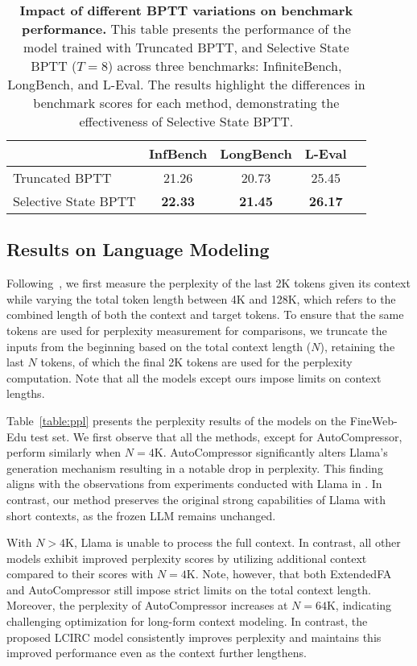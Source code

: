 \begin{table}[t]
\small
\centering
\begin{tabular}{lcccc}
\toprule
 & InfBench & LongBench & L-Eval \\ \midrule
Truncated BPTT & 21.26 & 20.73 & 25.45\\
Selective State BPTT & \textbf{22.33} & \textbf{21.45} & \textbf{26.17}\\ \bottomrule
\end{tabular}
\caption{\textbf{Impact of different BPTT variations on benchmark performance.} This table presents the performance of the model trained with Truncated BPTT, and Selective State BPTT ($T=8$) across three benchmarks: InfiniteBench, LongBench, and L-Eval. The results highlight the differences in benchmark scores for each method, demonstrating the effectiveness of Selective State BPTT.}
\label{table:cos}
\end{table}
\vspace{-0.2cm}


\subsection{Results on Language Modeling}
Following~\citet{autocompressor}, we first measure the perplexity of the last 2K tokens given its context while varying the total token length between 4K and 128K, which refers to the combined length of both the context and target tokens.
To ensure that the same tokens are used for perplexity measurement for comparisons, we truncate the inputs from the beginning based on the total context length ($N$), retaining the last $N$ tokens, of which the final 2K tokens are used for the perplexity computation.
Note that all the models except ours impose limits on context lengths. 

Table~\ref{table:ppl} presents the perplexity results of the models on the FineWeb-Edu test set.
We first observe that all the methods, except for AutoCompressor, perform similarly when $N=4$K.
AutoCompressor significantly alters Llama's generation mechanism resulting in a notable drop in perplexity.
This finding aligns with the observations from experiments conducted with Llama in \citet{autocompressor}.
In contrast, our method preserves the original strong capabilities of Llama with short contexts, as the frozen LLM remains unchanged.

With $N>4$K, Llama is unable to process the full context.
In contrast, all other models exhibit improved perplexity scores by utilizing additional context compared to their scores with $N=4$K. 
Note, however, that both ExtendedFA and AutoCompressor still impose strict limits on the total context length. 
Moreover, the perplexity of AutoCompressor increases at $N=64$K, indicating challenging optimization for long-form context modeling. 
In contrast, the proposed LCIRC model consistently improves perplexity and maintains this improved performance even as the context further lengthens.

